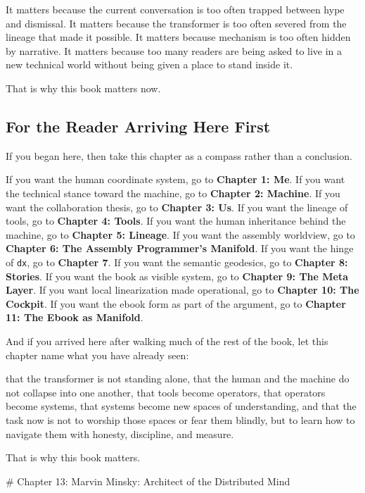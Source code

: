 \documentclass[
]{article}
\begin{document}
It matters because the current conversation is too often trapped between
hype and dismissal. It matters because the transformer is too often
severed from the lineage that made it possible. It matters because
mechanism is too often hidden by narrative. It matters because too many
readers are being asked to live in a new technical world without being
given a place to stand inside it.

That is why this book matters now.

\hypertarget{for-the-reader-arriving-here-first}{%
\subsection{For the Reader Arriving Here
First}\label{for-the-reader-arriving-here-first}}

If you began here, then take this chapter as a compass rather than a
conclusion.

If you want the human coordinate system, go to \textbf{Chapter 1: Me}.
If you want the technical stance toward the machine, go to
\textbf{Chapter 2: Machine}. If you want the collaboration thesis, go to
\textbf{Chapter 3: Us}. If you want the lineage of tools, go to
\textbf{Chapter 4: Tools}. If you want the human inheritance behind the
machine, go to \textbf{Chapter 5: Lineage}. If you want the assembly
worldview, go to \textbf{Chapter 6: The Assembly Programmer's Manifold}.
If you want the hinge of \texttt{dx}, go to \textbf{Chapter 7}. If you
want the semantic geodesics, go to \textbf{Chapter 8: Stories}. If you
want the book as visible system, go to \textbf{Chapter 9: The Meta
Layer}. If you want local linearization made operational, go to
\textbf{Chapter 10: The Cockpit}. If you want the ebook form as part of
the argument, go to \textbf{Chapter 11: The Ebook as Manifold}.

And if you arrived here after walking much of the rest of the book, let
this chapter name what you have already seen:

that the transformer is not standing alone, that the human and the
machine do not collapse into one another, that tools become operators,
that operators become systems, that systems become new spaces of
understanding, and that the task now is not to worship those spaces or
fear them blindly, but to learn how to navigate them with honesty,
discipline, and measure.

That is why this book matters.

\newpage
\vspace*{3cm}
\begin{center}
# Chapter 13: Marvin Minsky: Architect of the Distributed Mind
\end{center}
\end{document}
